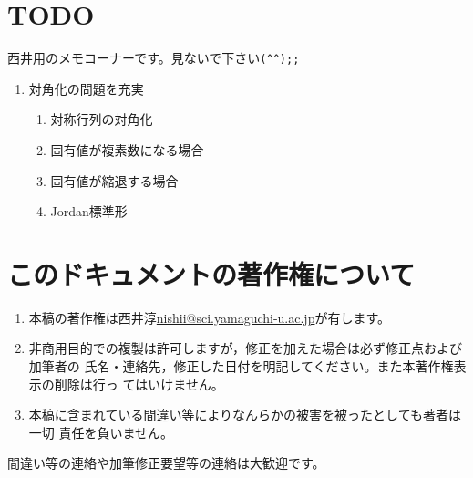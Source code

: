\documentclass[twocolumn,11pt]{jarticle}
\begin{document}
\newpage%


\appendix
\section{TODO}
西井用のメモコーナーです。見ないで下さい\verb|(^^);;|
\begin{enumerate}
\item 対角化の問題を充実
  \begin{enumerate}
  \item 対称行列の対角化
  \item 固有値が複素数になる場合
  \item 固有値が縮退する場合
  \item Jordan標準形
  \end{enumerate}
\end{enumerate}%

\section{このドキュメントの著作権について}

\begin{enumerate}
\item 本稿の著作権は西井淳\url{nishii@sci.yamaguchi-u.ac.jp}が有します。
\item 非商用目的での複製は許可しますが，修正を加えた場合は必ず修正点および加筆者の
氏名・連絡先，修正した日付を明記してください。また本著作権表示の削除は行っ
てはいけません。
\item 本稿に含まれている間違い等によりなんらかの被害を被ったとしても著者は一切
責任を負いません。
\end{enumerate}
間違い等の連絡や加筆修正要望等の連絡は大歓迎です。



\printindex%
\end{document}
